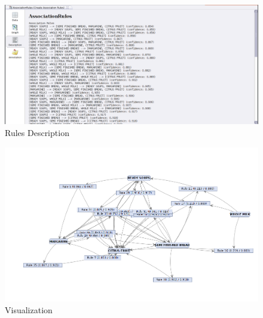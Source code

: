 \documentclass{article}\usepackage[]{graphicx}\usepackage[]{color}
\begin{document}
\begin{figure}[h]
\begin{center}
\includegraphics [scale=0.40]{ruleDesc.png}
\end{center}
\caption{Rules Description}
\end{figure}
\begin{figure}[h]
\begin{center}
\includegraphics [scale=0.55]{graph.png}
\end{center}
\caption{Visualization}
\end{figure}
\end{document}
